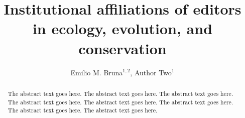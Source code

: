 \documentclass[]{rsos}%
\begin{document}
\title{Institutional affiliations of editors in ecology, evolution, and conservation}

\author{
Emilio M. Bruna$^{1,2}$,
Author Two$^{1}$}

\address{
  $^{1}$Department of Wildlife Ecology and Conservation, University of Florida, PO Box 110430, Gainesville, Florida, 32611 USA\\
  $^{2}$Center for Latin American Studies, University of Florida, PO Box 110530, Gainesville, Florida, 32611-0530 USA}
\subject{
Science, society \& policy}



\begin{abstract}
The abstract text goes here. The abstract text goes here. The abstract text goes here. The abstract text goes here. The abstract text goes here. The abstract text goes here. The abstract text goes here. The abstract text goes here.
\end{abstract}

\providecommand{\EndFirstPage}{%
}
\end{document}
